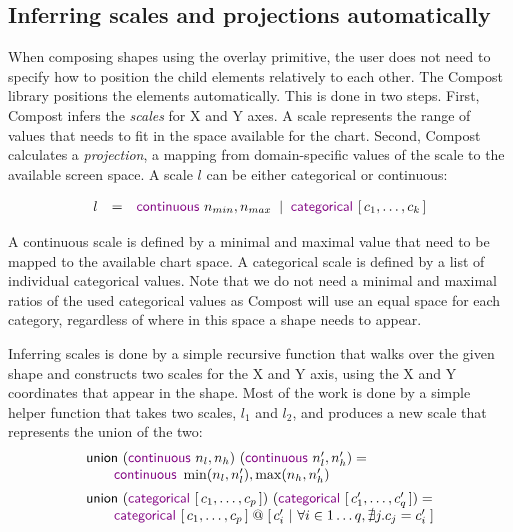 \documentclass{jfp}
\newcommand{\lsep}{\;\;|\;\;}
\newcommand{\ident}[1]{\textnormal{\textcolor{idclr}{\sffamily #1}}}
\newcommand{\kvd}[1]{\textnormal{\textcolor{kvdclr}{\sffamily #1}}}
\begin{document}
\subsection{Inferring scales and projections automatically}

When composing shapes using the \kvd{overlay} primitive, the user does not need to specify how
to position the child elements relatively to each other. The Compost library positions the elements
automatically. This is done in two steps. First, Compost infers the \emph{scales} for X and Y
axes. A scale represents the range of values that needs to fit in the space available for the chart.
Second, Compost calculates a \emph{projection}, a mapping from domain-specific values of the scale
to the available screen space. A scale $l$ can be either categorical or continuous:

\begin{equation*}
\begin{array}{rcl}
l & = & \kvd{continuous}~n_{min}, n_{max} \lsep \kvd{categorical}~[\,c_1, \ldots, c_k\,]
\end{array}
\end{equation*}

\vspace{-0.5em}
\noindent
A continuous scale is defined by a minimal and maximal value that need to be mapped to the
available chart space. A categorical scale is defined by a list of individual categorical values.
Note that we do not need a minimal and maximal ratios of the used categorical values as Compost
will use an equal space for each category, regardless of where in this space a shape needs to
appear.

Inferring scales is done by a simple recursive function that walks over the given shape and
constructs two scales for the X and Y axis, using the X and Y coordinates that appear in the shape.
Most of the work is done by a simple helper function that takes two scales, $l_1$ and $l_2$,
and produces a new scale that represents the union of the two:
%
\begin{equation*}
\begin{array}{l}
\ident{union}~(\kvd{continuous}~n_l, n_h)~(\kvd{continuous}~n'_l, n'_h) =\\
\qquad\kvd{continuous}~\min(n_l, n'_l), \max(n_h, n'_h)\\[0.5em]
\ident{union}~(\kvd{categorical}~[\,c_1, \ldots, c_p\,])~(\kvd{categorical}~[\,c'_1, \ldots, c'_q\,]) =\\
\qquad \kvd{categorical}~[\,c_1, \ldots, c_p\,] \;@\; [\,c'_i~|~ \forall i\in 1\ldots q, \nexists j. c_j = c'_i \;]
\end{array}
\end{equation*}
\end{document}
